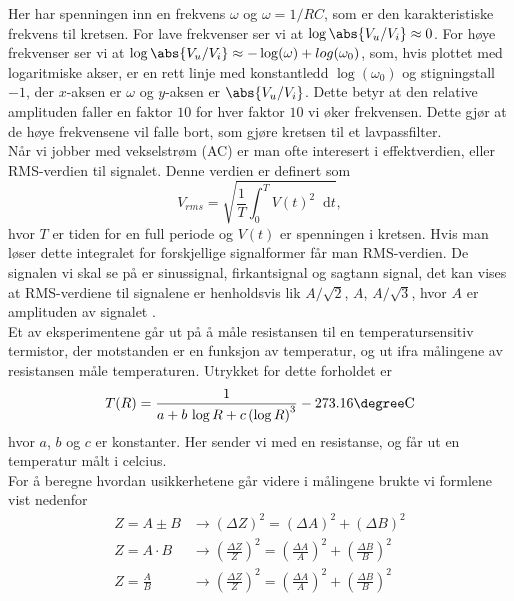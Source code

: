 \documentclass[%
 reprint,
 amsmath,amssymb,
 aps,
]{revtex4-1}
\newcommand*\diff{\mathop{}\!\mathrm{d}}
\begin{document}
Her har spenningen inn en frekvens $\omega$ og $\omega = 1/RC$, som er den karakteristiske frekvens til kretsen. For lave frekvenser ser vi at $\log\abs{V_u/V_i}\approx 0$. For høye frekvenser ser vi at $\log\abs{V_u/V_i}\approx -\log(\omega) + log(\omega_0)$, som, hvis plottet med logaritmiske akser, er en rett linje med konstantledd $\log(\omega_0)$ og stigningstall $-1$, der $x$-aksen er $\omega$ og $y$-aksen er $\abs{V_u/V_i}$. Dette betyr at den relative amplituden faller en faktor $10$ for hver faktor $10$ vi øker frekvensen. Dette gjør at de høye frekvensene vil falle bort, som gjøre kretsen til et lavpassfilter.
\\
Når vi jobber med vekselstrøm (AC) er man ofte interesert i effektverdien, eller RMS-verdien til signalet. Denne verdien er definert som
\begin{equation}
  V_{rms} = \sqrt{\frac{1}{T} \int_0^T V(t)^2 \diff t} \label{rms},
\end{equation}hvor $T$ er tiden for en full periode og $V(t)$ er spenningen i kretsen. Hvis man løser dette integralet for forskjellige signalformer får man RMS-verdien. De signalen vi skal se på er sinussignal, firkantsignal og sagtann signal, det kan vises at RMS-verdiene til signalene er henholdsvis lik $A/\sqrt{2}$, $A$, $A/\sqrt{3}$, hvor $A$ er amplituden av signalet \cite{rms_wiki}.
\\
Et av eksperimentene går ut på å måle resistansen til en temperatursensitiv termistor, der motstanden er en funksjon av temperatur, og ut ifra målingene av resistansen måle temperaturen. Utrykket for dette forholdet er
\begin{equation}
  T(R) = \frac{1}{a+b\, \log R + c \left(\log R\right)^3} - 273.16 \degree\text{C} \label{calc_temp}
\end{equation}hvor $a$, $b$ og $c$ er konstanter. Her sender vi med en resistanse, og får ut en temperatur målt i celcius. \\
For å beregne hvordan usikkerhetene går videre i målingene brukte vi formlene \cite{squires} vist nedenfor
\begin{align*}
  Z = A \pm B &\rightarrow \left(\Delta Z\right)^2 =  \left(\Delta A\right)^2 +\left(\Delta B\right)^2 \\
  Z = A\cdot B &\rightarrow \left(\frac{\Delta Z}{Z}\right)^2 =  \left(\frac{\Delta A}{A}\right)^2 +\left(\frac{\Delta B}{B}\right)^2 \\
  Z = \frac{A}{B} &\rightarrow \left(\frac{\Delta Z}{Z}\right)^2 =  \left(\frac{\Delta A}{A}\right)^2 +\left(\frac{\Delta B}{B}\right)^2
\end{align*}
\end{document}
